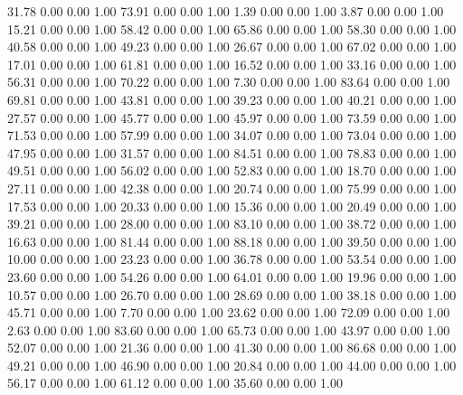    31.78   0.00   0.00   1.00
   73.91   0.00   0.00   1.00
    1.39   0.00   0.00   1.00
    3.87   0.00   0.00   1.00
   15.21   0.00   0.00   1.00
   58.42   0.00   0.00   1.00
   65.86   0.00   0.00   1.00
   58.30   0.00   0.00   1.00
   40.58   0.00   0.00   1.00
   49.23   0.00   0.00   1.00
   26.67   0.00   0.00   1.00
   67.02   0.00   0.00   1.00
   17.01   0.00   0.00   1.00
   61.81   0.00   0.00   1.00
   16.52   0.00   0.00   1.00
   33.16   0.00   0.00   1.00
   56.31   0.00   0.00   1.00
   70.22   0.00   0.00   1.00
    7.30   0.00   0.00   1.00
   83.64   0.00   0.00   1.00
   69.81   0.00   0.00   1.00
   43.81   0.00   0.00   1.00
   39.23   0.00   0.00   1.00
   40.21   0.00   0.00   1.00
   27.57   0.00   0.00   1.00
   45.77   0.00   0.00   1.00
   45.97   0.00   0.00   1.00
   73.59   0.00   0.00   1.00
   71.53   0.00   0.00   1.00
   57.99   0.00   0.00   1.00
   34.07   0.00   0.00   1.00
   73.04   0.00   0.00   1.00
   47.95   0.00   0.00   1.00
   31.57   0.00   0.00   1.00
   84.51   0.00   0.00   1.00
   78.83   0.00   0.00   1.00
   49.51   0.00   0.00   1.00
   56.02   0.00   0.00   1.00
   52.83   0.00   0.00   1.00
   18.70   0.00   0.00   1.00
   27.11   0.00   0.00   1.00
   42.38   0.00   0.00   1.00
   20.74   0.00   0.00   1.00
   75.99   0.00   0.00   1.00
   17.53   0.00   0.00   1.00
   20.33   0.00   0.00   1.00
   15.36   0.00   0.00   1.00
   20.49   0.00   0.00   1.00
   39.21   0.00   0.00   1.00
   28.00   0.00   0.00   1.00
   83.10   0.00   0.00   1.00
   38.72   0.00   0.00   1.00
   16.63   0.00   0.00   1.00
   81.44   0.00   0.00   1.00
   88.18   0.00   0.00   1.00
   39.50   0.00   0.00   1.00
   10.00   0.00   0.00   1.00
   23.23   0.00   0.00   1.00
   36.78   0.00   0.00   1.00
   53.54   0.00   0.00   1.00
   23.60   0.00   0.00   1.00
   54.26   0.00   0.00   1.00
   64.01   0.00   0.00   1.00
   19.96   0.00   0.00   1.00
   10.57   0.00   0.00   1.00
   26.70   0.00   0.00   1.00
   28.69   0.00   0.00   1.00
   38.18   0.00   0.00   1.00
   45.71   0.00   0.00   1.00
    7.70   0.00   0.00   1.00
   23.62   0.00   0.00   1.00
   72.09   0.00   0.00   1.00
    2.63   0.00   0.00   1.00
   83.60   0.00   0.00   1.00
   65.73   0.00   0.00   1.00
   43.97   0.00   0.00   1.00
   52.07   0.00   0.00   1.00
   21.36   0.00   0.00   1.00
   41.30   0.00   0.00   1.00
   86.68   0.00   0.00   1.00
   49.21   0.00   0.00   1.00
   46.90   0.00   0.00   1.00
   20.84   0.00   0.00   1.00
   44.00   0.00   0.00   1.00
   56.17   0.00   0.00   1.00
   61.12   0.00   0.00   1.00
   35.60   0.00   0.00   1.00
